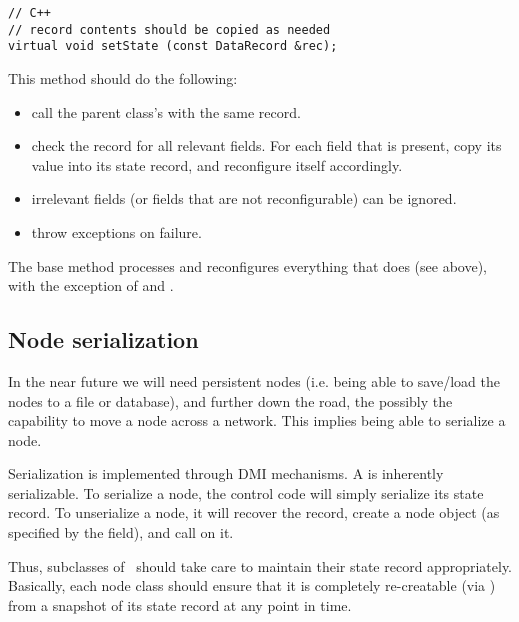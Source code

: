 \documentclass[10pt]{article}
\begin{document}
\begin{verbatim}
// C++
// record contents should be copied as needed
virtual void setState (const DataRecord &rec);
\end{verbatim}
  
  This method should do the following:

  \begin{itemize}
    
  \item call the parent class's  with the same record.
  
  \item check the record for all relevant fields. For each field that is
    present, copy its value into its state record, and reconfigure itself
    accordingly.

  \item irrelevant fields (or fields that are not reconfigurable) can be
    ignored.
    
  \item throw exceptions on failure.

  \end{itemize}
  
  The base  method processes and reconfigures everything
  that  does (see above), with the exception of 
  and .
  
\subsection{Node serialization}

  In the near future we will need persistent nodes (i.e. being able to
  save/load the nodes to a file or database), and further down the road, the
  possibly the capability to move a node across a network. This implies being
  able to serialize a node.
  
  Serialization is implemented through DMI mechanisms. A  is
  inherently serializable. To serialize a node, the control code will simply
  serialize its state record. To unserialize a node, it will recover the
  record, create a node object (as specified by the  field), and call
   on it. 

  Thus, subclasses of \Node\ should take care to maintain their state record
  appropriately. Basically, each node class should ensure that it is completely
  re-creatable (via ) from a snapshot of its state record at any
  point in time.
\end{document}
